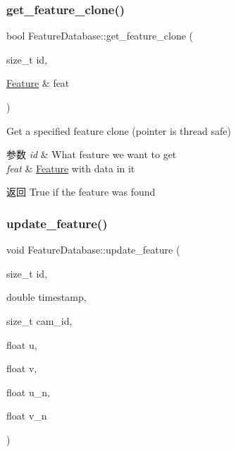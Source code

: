 \subsubsection{\texorpdfstring{get\+\_\+feature\+\_\+clone()}{get\_feature\_clone()}}
{\footnotesize\ttfamily bool Feature\+Database\+::get\+\_\+feature\+\_\+clone (\begin{DoxyParamCaption}\item[{size\+\_\+t}]{id,  }\item[{\hyperlink{classov__core_1_1Feature}{Feature} \&}]{feat }\end{DoxyParamCaption})}



Get a specified feature clone (pointer is thread safe) 


\begin{DoxyParams}{参数}
{\em id} & What feature we want to get \\
\hline
{\em feat} & \hyperlink{classov__core_1_1Feature}{Feature} with data in it \\
\hline
\end{DoxyParams}
\begin{DoxyReturn}{返回}
True if the feature was found 
\end{DoxyReturn}
\mbox{\label{classov__core_1_1FeatureDatabase_adf78008573a5aebe8a89cddbaf4b5b01}} 
\subsubsection{\texorpdfstring{update\+\_\+feature()}{update\_feature()}}
{\footnotesize\ttfamily void Feature\+Database\+::update\+\_\+feature (\begin{DoxyParamCaption}\item[{size\+\_\+t}]{id,  }\item[{double}]{timestamp,  }\item[{size\+\_\+t}]{cam\+\_\+id,  }\item[{float}]{u,  }\item[{float}]{v,  }\item[{float}]{u\+\_\+n,  }\item[{float}]{v\+\_\+n }\end{DoxyParamCaption})}



